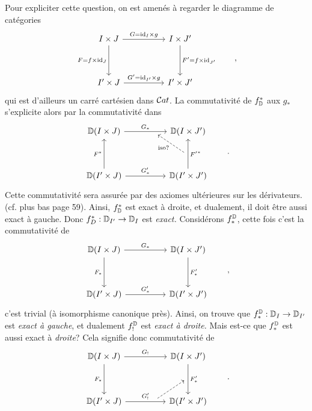 
Pour expliciter cette question, on est amenés à regarder le diagramme de catégories
\[
\begin{tikzcd}[column sep=huge, row sep=huge]
I \times J \arrow[r, "G = \id_I \times g"] \arrow[d, "F = f \times \id_J"'] & I \times J' \arrow[d, "F' = f \times \id_{J'}"] \\
I' \times J \arrow[r, "G' = \id_{I'} \times g"] & I' \times J'
\end{tikzcd}
\qquad ,
\]
qui est d'ailleurs un carré cartésien dans $\mathcal{C}at$. La commutativité de $f^*_{\mathbb{D}}$ aux $g_*$ s'explicite alors par la commutativité dans
\[
\begin{tikzcd}[column sep=huge, row sep=huge]
\D(I \times J) \arrow[r, "G_*", ""{name=T, below, near end}] & \D(I \times J') \\
\D(I' \times J) \arrow[u, "F^*"] \arrow[r, "G'_*"] & \D(I' \times J') \arrow[u, "{F'}^*"', ""{name=R, left}]
\arrow[dashed, from=R, to=T, "\text{iso?}"]
\end{tikzcd}
\qquad .
\]
Cette commutativité sera assurée par des axiomes ultérieures sur les dérivateurs. (cf. plus %
bas page 59). Ainsi, $f^*_{\mathbb{D}}$ est exact à droite, et dualement, il doit être aussi exact à gauche. Donc $f^*_D : \mathbb{D}_{I'} \to \mathbb{D}_I$ est \textit{exact.} Considérons $f^{\mathbb{D}}_*$, %
cette fois c'est la commutativité de
\[
\begin{tikzcd}[column sep=huge, row sep=huge]
\D(I \times J) \arrow[r, "G_*"] \arrow[d, "F_*"'] & \D(I \times J') \arrow[d, "F'_*"] \\
\D(I' \times J) \arrow[r, "G'_*"] & \D(I' \times J')
\end{tikzcd}
\qquad ,
\]
c'est trivial (à isomorphisme canonique près). Ainsi, on
trouve que $f^{\mathbb{D}}_* : \mathbb{D}_I \to \mathbb{D}_{I'}$ est \textit{exact à gauche}, et dualement $f^{\mathbb{D}}_!$ est \textit{exact à droite.} Mais est-ce que $f^{\mathbb{D}}_*$ est aussi exact à \textit{droite}? Cela signifie donc commutativité de
\[
\begin{tikzcd}[column sep=huge, row sep=huge]
\D(I \times J) \arrow[r, "G_!"] \arrow[d, "F_*"'] & \D(I \times J') \arrow[d, "F'_*", ""{name=R2, left}] \\
\D(I' \times J) \arrow[r, "G'_!", ""{name=B, above, near end}] & \D(I' \times J')
\arrow[dashed, from=B, to=R2]
\end{tikzcd}
\qquad .
\]


